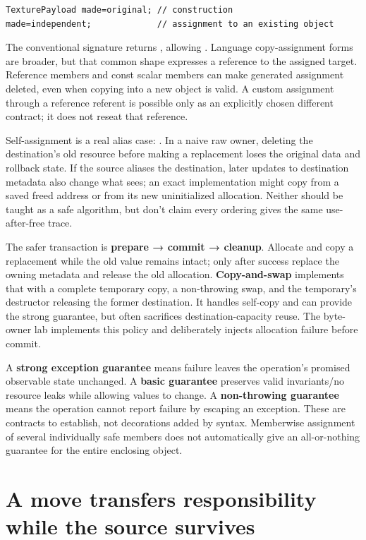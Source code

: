 \begin{verbatim}
TexturePayload made=original; // construction
made=independent;             // assignment to an existing object
\end{verbatim}

The conventional signature  returns , allowing . Language copy-assignment forms are broader, but that common shape expresses a reference to the assigned target. Reference members and const scalar members can make generated assignment deleted, even when copying into a new object is valid. A custom assignment through a reference referent is possible only as an explicitly chosen different contract; it does not reseat that reference.

Self-assignment is a real alias case: . In a naive raw owner, deleting the destination's old resource before making a replacement loses the original data and rollback state. If the source aliases the destination, later updates to destination metadata also change what  sees; an exact implementation might copy from a saved freed address or from its new uninitialized allocation. Neither should be taught as a safe algorithm, but don't claim every ordering gives the same use-after-free trace.

The safer transaction is \textbf{prepare → commit → cleanup}. Allocate and copy a replacement while the old value remains intact; only after success replace the owning metadata and release the old allocation. \textbf{Copy-and-swap} implements that with a complete temporary copy, a non-throwing swap, and the temporary's destructor releasing the former destination. It handles self-copy and can provide the strong guarantee, but often sacrifices destination-capacity reuse. The byte-owner lab implements this policy and deliberately injects allocation failure before commit.

A \textbf{strong exception guarantee} means failure leaves the operation's promised observable state unchanged. A \textbf{basic guarantee} preserves valid invariants/no resource leaks while allowing values to change. A \textbf{non-throwing guarantee} means the operation cannot report failure by escaping an exception. These are contracts to establish, not decorations added by syntax. Memberwise assignment of several individually safe members does not automatically give an all-or-nothing guarantee for the entire enclosing object.

\section{A move transfers responsibility while the source survives}\label{01-foundations-i-ch003-a-move-transfers-responsibility-while-the-source-survives}

